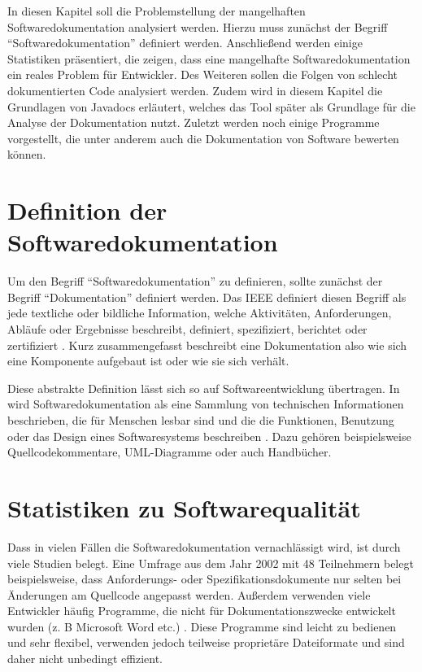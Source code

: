 \label{sec:background}
In diesen Kapitel soll die Problemstellung der mangelhaften Softwaredokumentation analysiert werden. Hierzu muss zunächst der Begriff \enquote{Softwaredokumentation} definiert werden. Anschließend werden einige Statistiken präsentiert, die zeigen, dass eine mangelhafte Softwaredokumentation ein reales Problem für Entwickler. Des Weiteren sollen die Folgen von schlecht dokumentierten Code analysiert werden. Zudem wird in diesem Kapitel die Grundlagen von Javadocs erläutert, welches das Tool später als Grundlage für die Analyse der Dokumentation nutzt. Zuletzt werden noch einige Programme vorgestellt, die unter anderem auch die Dokumentation von Software bewerten können. 

\section{Definition der Softwaredokumentation}
Um den Begriff \enquote{Softwaredokumentation} zu definieren, sollte zunächst der Begriff \enquote{Dokumentation} definiert werden. Das IEEE  definiert diesen Begriff als jede textliche oder bildliche Information, welche Aktivitäten, Anforderungen, Abläufe oder Ergebnisse beschreibt, definiert, spezifiziert, berichtet oder zertifiziert \cite[S. 28]{IEEEStandardGlossaryofSoftwareEngineeringTerminology}. Kurz zusammengefasst beschreibt eine Dokumentation also wie sich eine Komponente aufgebaut ist oder wie sie sich verhält. 

Diese abstrakte Definition lässt sich so auf Softwareentwicklung übertragen. In \cite[S. 125]{Softwaredocumentationandstandards} wird Softwaredokumentation als eine Sammlung von technischen Informationen beschrieben, die für Menschen lesbar sind und die die Funktionen, Benutzung oder das Design eines Softwaresystems beschreiben . Dazu gehören beispielsweise Quellcodekommentare, UML-Diagramme oder auch Handbücher.

\section{Statistiken zu Softwarequalität}
Dass in vielen Fällen die Softwaredokumentation vernachlässigt wird, ist durch viele Studien belegt. Eine Umfrage aus dem Jahr 2002 mit 48 Teilnehmern belegt beispielsweise, dass Anforderungs- oder Spezifikationsdokumente nur selten bei Änderungen am Quellcode angepasst werden. Außerdem verwenden viele Entwickler häufig Programme, die nicht für Dokumentationszwecke entwickelt wurden (z. B Microsoft Word etc.) \cite[S. 28-29]{TheRelevanceofSoftwareDocumentationToolsandTechnologies:ASurvey}. Diese Programme sind leicht zu bedienen und sehr flexibel, verwenden jedoch teilweise proprietäre Dateiformate und sind daher nicht unbedingt effizient.

